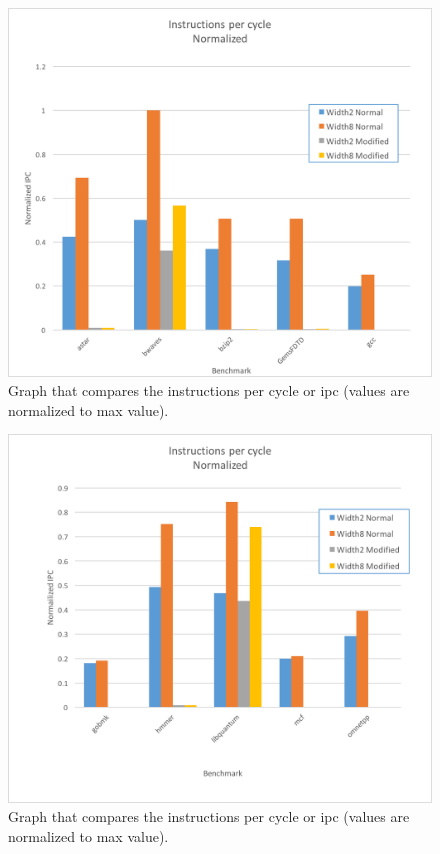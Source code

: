 \documentclass[letterpaper, 10pt, conference]{ieeeconf}  %
\begin{document}
\begin{figure}[thpb]
	\centering
	\includegraphics[scale=.45]{IPC1}
   \caption{Graph that compares the instructions per cycle or ipc (values are normalized to max value).}
\end{figure}

\begin{figure}[thpb]
	\centering
	\includegraphics[scale=.45]{IPC2}
   \caption{Graph that compares the instructions per cycle or ipc (values are normalized to max value).}
\end{figure}
\end{document}
